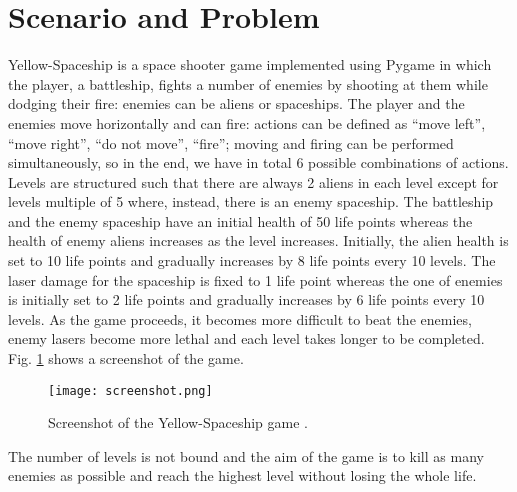 \section{Scenario and Problem}
Yellow-Spaceship \cite{Yellow-Spaceship} is a space shooter game implemented using Pygame \cite{PyGame} in which the
player, a battleship, fights a number of enemies by shooting at them while dodging their fire:
enemies can be aliens or spaceships. The player and the enemies move horizontally and
can fire: actions can be defined as “move left”, “move right”, “do not move”, “fire”; moving
and firing can be performed simultaneously, so in the end, we have in total 6 possible
combinations of actions. Levels are structured such that there are always 2 aliens in
each level except for levels multiple of 5 where, instead, there is an enemy spaceship. The battleship
and the enemy spaceship have an initial health of 50 life points whereas the health of enemy
aliens increases as the level increases. Initially, the alien health is set to 10 life points and
gradually increases by 8 life points every 10 levels. The laser damage for the spaceship is
fixed to 1 life point whereas the one of enemies is initially set to 2 life points and gradually
increases by 6 life points every 10 levels. As the game proceeds, it becomes more difficult
to beat the enemies, enemy lasers become more lethal and each level takes longer to be completed. 
Fig. \ref{fig:game_screenshot} shows a screenshot of the game.

\begin{figure}[ht]
\centerline{\texttt{[image: screenshot.png]}}
\caption{Screenshot of the Yellow-Spaceship game \cite{Yellow-Spaceship}.}
\label{fig:game_screenshot}
\end{figure}

The number of levels is not bound and the aim of the game is to kill as many enemies as
possible and reach the highest level without losing the whole life.
